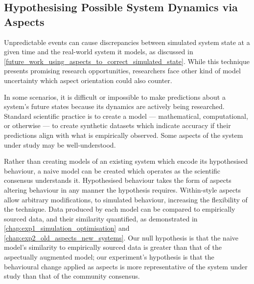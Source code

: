 


\subsection{Hypothesising Possible System Dynamics via Aspects}


Unpredictable events can cause discrepancies between simulated system state at a
given time and the real-world system it models, as discussed in
\cref{future_work_using_aspects_to_correct_simulated_state}. While this
technique presents promising research opportunities, researchers face other kind
of model uncertainty which aspect orientation could also counter.

In some scenarios, it is difficult or impossible to make predictions about a
system's future states because its dynamics are actively being researched.
Standard scientific practice is to create a model --- mathematical,
computational, or otherwise --- to create synthetic datasets which indicate
accuracy if their predictions align with what is empirically observed.
 Some aspects of the system under study may be
well-understood.

Rather than creating models of an existing system which encode its hypothesised
behaviour, a naive model can be created which operates as the scientific
consensus understands it. Hypothesised behaviour takes the form of aspects
altering behaviour in any manner the hypothesis requires. Within-style aspects
allow arbitrary modifications, to simulated behaviour, increasing the
flexibility of the technique. Data produced by each model can be compared to
empirically sourced data, and their similarity quantified, as demonstrated in
\cref{chap:exp1_simulation_optimisation} and
\cref{chap:exp2_old_aspects_new_systems}. Our null hypothesis is that the naive
model's similarity to empirically sourced data is greater than that of the
aspectually augmented model; our experiment's hypothesis is that the behavioural
change applied as aspects is more representative of the system under study than
that of the community consensus.

